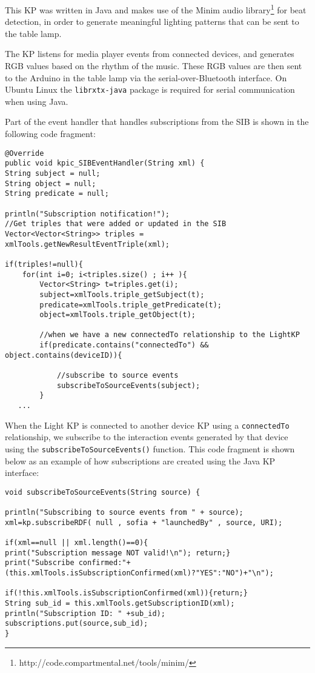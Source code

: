 This \ac{KP} was written in Java and makes use of the Minim audio library\footnote{http://code.compartmental.net/tools/minim/} for beat detection, in order to generate meaningful lighting patterns that can be sent to the table lamp.

The \ac{KP} listens for media player events from connected devices, and generates RGB values based on the rhythm of the music. These RGB values are then sent to the Arduino in the table lamp via the serial-over-Bluetooth interface. On Ubuntu Linux the \texttt{librxtx-java} package is required for serial communication when using Java.

Part of the event handler that handles subscriptions from the \ac{SIB} is shown in the following code fragment:

\begin{verbatim}
@Override
public void kpic_SIBEventHandler(String xml) {
String subject = null;
String object = null;
String predicate = null;

println("Subscription notification!");
//Get triples that were added or updated in the SIB
Vector<Vector<String>> triples = xmlTools.getNewResultEventTriple(xml);

if(triples!=null){
	for(int i=0; i<triples.size() ; i++ ){ 
		Vector<String> t=triples.get(i);
		subject=xmlTools.triple_getSubject(t);
		predicate=xmlTools.triple_getPredicate(t);
		object=xmlTools.triple_getObject(t);

		//when we have a new connectedTo relationship to the LightKP
		if(predicate.contains("connectedTo") && object.contains(deviceID)){

			//subscribe to source events
			subscribeToSourceEvents(subject);
		}
   ...	
\end{verbatim}

When the Light \ac{KP} is connected to another device \ac{KP} using a \texttt{connectedTo} relationship, we subscribe to the interaction events generated by that device using the \texttt{subscribeToSourceEvents()} function. This code fragment is shown below as an example of how subscriptions are created using the Java \ac{KP} interface:

\begin{verbatim}
void subscribeToSourceEvents(String source) {

println("Subscribing to source events from " + source); 
xml=kp.subscribeRDF( null , sofia + "launchedBy" , source, URI);

if(xml==null || xml.length()==0){
print("Subscription message NOT valid!\n"); return;}
print("Subscribe confirmed:"+
(this.xmlTools.isSubscriptionConfirmed(xml)?"YES":"NO")+"\n");

if(!this.xmlTools.isSubscriptionConfirmed(xml)){return;}
String sub_id = this.xmlTools.getSubscriptionID(xml);
println("Subscription ID: " +sub_id);
subscriptions.put(source,sub_id);
}	
\end{verbatim}


